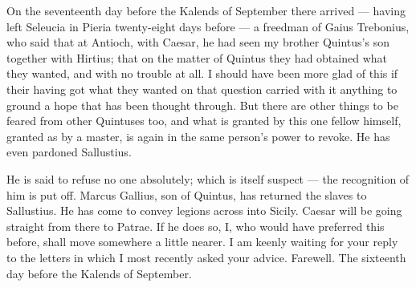

 On the seventeenth day before the Kalends of September there arrived --- having left Seleucia in Pieria twenty-eight days before --- a freedman of Gaius Trebonius, who said that at Antioch, with Caesar, he had seen my brother Quintus's son together with Hirtius; that on the matter of Quintus they had obtained what they wanted, and with no trouble at all. I should have been more glad of this if their having got what they wanted on that question carried with it anything to ground a hope that has been thought through. But there are other things to be feared from other Quintuses too, and what is granted by this one fellow himself, granted as by a master, is again in the same person's power to revoke. He has even pardoned Sallustius.

 He is said to refuse no one absolutely; which is itself suspect --- the recognition of him is put off. Marcus Gallius, son of Quintus, has returned the slaves to Sallustius. He has come to convey legions across into Sicily. Caesar will be going straight from there to Patrae. If he does so, I, who would have preferred this before, shall move somewhere a little nearer. I am keenly waiting for your reply to the letters in which I most recently asked your advice. Farewell. The sixteenth day before the Kalends of September.
